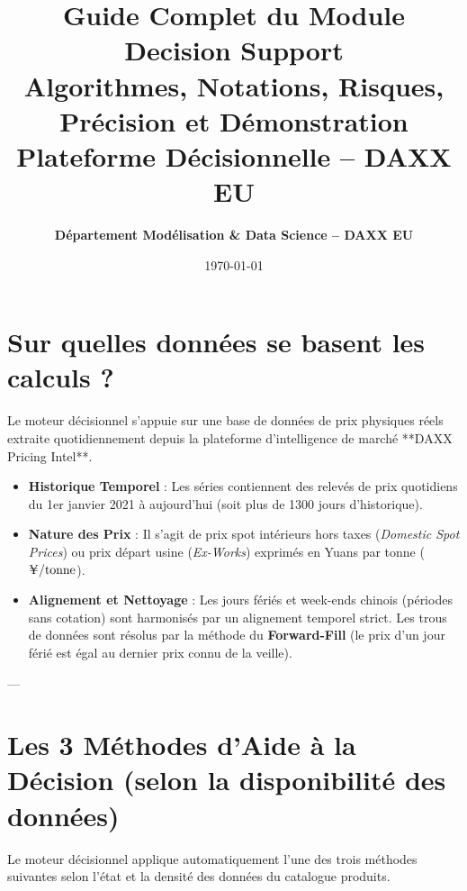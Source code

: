 \documentclass[12pt,a4paper]{article}
\title{\textbf{Guide Complet du Module Decision Support \\ Algorithmes, Notations, Risques, Précision et Démonstration \\ Plateforme Décisionnelle -- DAXX EU}}
\author{\textbf{Département Modélisation \& Data Science -- DAXX EU}}
\date{\today}
\begin{document}
\maketitle
\tableofcontents
\newpage

\section{Sur quelles données se basent les calculs ?}
Le moteur décisionnel s'appuie sur une base de données de prix physiques réels extraite quotidiennement depuis la plateforme d'intelligence de marché **DAXX Pricing Intel**.

\begin{itemize}
    \item \textbf{Historique Temporel} : Les séries contiennent des relevés de prix quotidiens du 1er janvier 2021 à aujourd'hui (soit plus de 1300 jours d'historique).
    \item \textbf{Nature des Prix} : Il s'agit de prix spot intérieurs hors taxes (\textit{Domestic Spot Prices}) ou prix départ usine (\textit{Ex-Works}) exprimés en Yuans par tonne ($\text{\yen}/\text{tonne}$).
    \item \textbf{Alignement et Nettoyage} : Les jours fériés et week-ends chinois (périodes sans cotation) sont harmonisés par un alignement temporel strict. Les trous de données sont résolus par la méthode du \textbf{Forward-Fill} (le prix d'un jour férié est égal au dernier prix connu de la veille).
\end{itemize}

---

\section{Les 3 Méthodes d'Aide à la Décision (selon la disponibilité des données)}
Le moteur décisionnel applique automatiquement l'une des trois méthodes suivantes selon l'état et la densité des données du catalogue produits.
\end{document}

